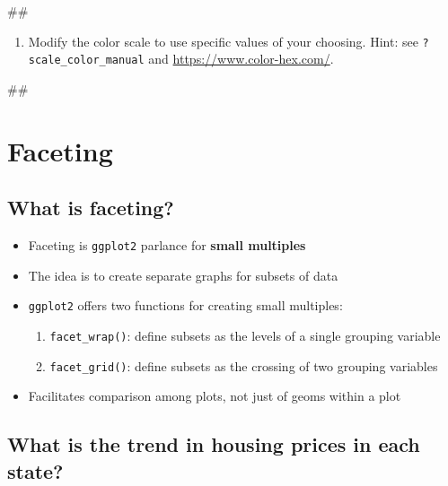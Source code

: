 \documentclass[]{book}
\newenvironment{Shaded}{\begin{snugshade}}{\end{snugshade}}
\newcommand{\NormalTok}[1]{#1}
\providecommand{\tightlist}{%
  \setlength{\itemsep}{0pt}\setlength{\parskip}{0pt}}
\begin{document}
\begin{Shaded}
\begin{Highlighting}[]
\NormalTok{## }
\end{Highlighting}
\end{Shaded}

\begin{enumerate}
\def\labelenumi{\arabic{enumi}.}
\setcounter{enumi}{2}
\tightlist
\item
  Modify the color scale to use specific values of your choosing. Hint:
  see \texttt{?scale\_color\_manual} and
  \url{https://www.color-hex.com/}.
\end{enumerate}

\begin{Shaded}
\begin{Highlighting}[]
\NormalTok{## }
\end{Highlighting}
\end{Shaded}

\section{Faceting}\label{faceting}

\subsection{What is faceting?}\label{what-is-faceting}

\begin{itemize}
\tightlist
\item
  Faceting is \texttt{ggplot2} parlance for \textbf{small multiples}
\item
  The idea is to create separate graphs for subsets of data
\item
  \texttt{ggplot2} offers two functions for creating small multiples:

  \begin{enumerate}
  \def\labelenumi{\arabic{enumi}.}
  \tightlist
  \item
    \texttt{facet\_wrap()}: define subsets as the levels of a single
    grouping variable
  \item
    \texttt{facet\_grid()}: define subsets as the crossing of two
    grouping variables
  \end{enumerate}
\item
  Facilitates comparison among plots, not just of geoms within a plot
\end{itemize}

\subsection{What is the trend in housing prices in each
state?}\label{what-is-the-trend-in-housing-prices-in-each-state}
\end{document}
